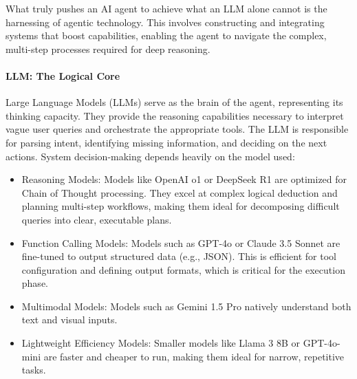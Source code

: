 What truly pushes an AI agent to achieve what an LLM alone cannot is the harnessing of agentic technology. This involves constructing and integrating systems that boost capabilities, enabling the agent to navigate the complex, multi-step processes required for deep reasoning.

\paragraph*{LLM: The Logical Core}
Large Language Models (LLMs) serve as the brain of the agent, representing its thinking capacity. They provide the reasoning capabilities necessary to interpret vague user queries and orchestrate the appropriate tools. The LLM is responsible for parsing intent, identifying missing information, and deciding on the next actions. System decision-making depends heavily on the model used:
\begin{itemize}
    \item {Reasoning Models:} Models like OpenAI o1 or DeepSeek R1 are optimized for Chain of Thought processing. They excel at complex logical deduction and planning multi-step workflows, making them ideal for decomposing difficult queries into clear, executable plans.
    \item {Function Calling Models:} Models such as GPT-4o or Claude 3.5 Sonnet are fine-tuned to output structured data (e.g., JSON). This is efficient for tool configuration and defining output formats, which is critical for the execution phase.
    \item {Multimodal Models:} Models such as Gemini 1.5 Pro natively understand both text and visual inputs.
    \item {Lightweight Efficiency Models:} Smaller models like Llama 3 8B or GPT-4o-mini are faster and cheaper to run, making them ideal for narrow, repetitive tasks. 
\end{itemize}


